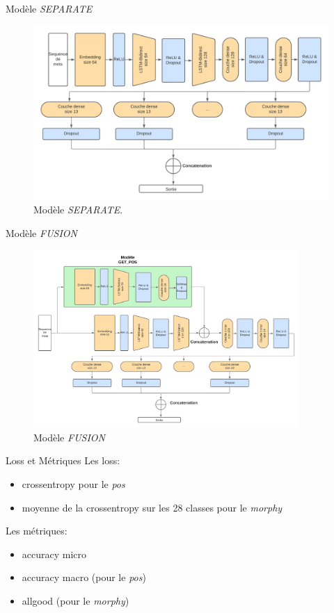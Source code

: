 \documentclass[11pt]{beamer}
\begin{document}
\begin{frame}{Modèle \textit{SEPARATE}}
    \begin{figure}
        \centering
        \includegraphics[width=\textwidth]{get_morphy_separate.png}
        \caption{Modèle \textit{SEPARATE}.}
        \label{fig: model separate}
    \end{figure}
\end{frame}

\begin{frame}{Modèle \textit{FUSION}}
    \begin{figure}[!ht]
        \centering
        \includegraphics[width=0.9\textwidth]{get_morphy_fusion.png}
        \caption{Modèle \textit{FUSION}}
        \label{fig: model fusion}
    \end{figure}
\end{frame}

\begin{frame}{Loss et Métriques}
    Les loss:
    \begin{itemize}
        \item crossentropy pour le \textit{pos}
        \item moyenne de la crossentropy sur les 28 classes pour le \textit{morphy}
    \end{itemize}
    Les métriques:
    \begin{itemize}
        \item accuracy micro
        \item accuracy macro (pour le \textit{pos})
        \item allgood (pour le \textit{morphy})
    \end{itemize}
\end{frame}
\end{document}
